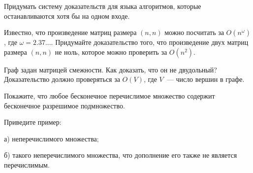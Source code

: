 \setcounter{curtask}{1}


\begin{task}
	Придумать систему доказательств для языка алгоритмов, которые останавливаются
    хотя бы на одном входе.
\end{task}

\begin{task}
    Известно, что произведение матриц размера $(n, n)$ можно посчитать за
    $O(n^{\omega})$, где $\omega =  2.37...$. Придумайте доказательство того, что
    произведение двух матриц размера $(n, n)$ не ноль, которое можно проверить за
    $O(n^2)$.
\end{task}

\begin{task}
    Граф задан матрицей смежности. Как доказать, что он не двудольный? Доказательство
    должно проверяться за $O(V)$, где $V$~--- число вершин в графе.
\end{task}

\begin{task}
	Покажите, что любое бесконечное перечислимое множество содержит бесконечное
    разрешимое подмножество.    
\end{task}

\begin{task}
    Приведите пример:
    
    а) неперечислимого множества;

    б) такого неперечислимого множества, что дополнение его также не является
    перечислимым.
\end{task}